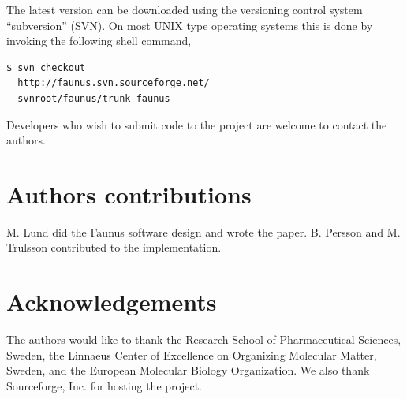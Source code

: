 \documentclass[10pt]{bmc_article}
\newenvironment{bmcformat}{\fussy\setboolean{publ}{true}}{\fussy}
\begin{document}
\begin{bmcformat}
The latest version can be downloaded using the versioning control system ``subversion'' (SVN).
On most UNIX type operating systems this is done by invoking the following shell command,
\begin{verbatim}
$ svn checkout
  http://faunus.svn.sourceforge.net/
  svnroot/faunus/trunk faunus
\end{verbatim}
Developers who wish to submit code to the project are welcome to contact the authors.


\section*{Authors contributions}
M. Lund did the Faunus software design and wrote the paper.
B. Persson and M. Trulsson contributed to the implementation.

\section*{Acknowledgements}
  The authors would like to thank the Research School of Pharmaceutical Sciences, Sweden, the Linnaeus Center of Excellence on Organizing Molecular Matter, Sweden,
and the European Molecular Biology Organization.
We also thank Sourceforge, Inc. for hosting the project.

 

{
   }     %



\end{bmcformat}
\end{document}
